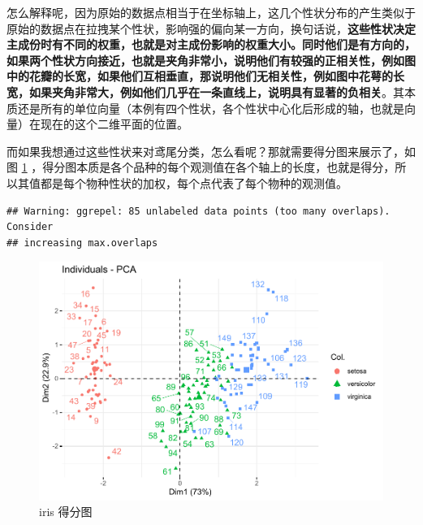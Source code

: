 \documentclass[
]{krantz}
\makeatletter
\newenvironment{Shaded}{\begin{snugshade}}{\end{snugshade}}
\newcommand{\AttributeTok}[1]{\textcolor[rgb]{0.77,0.63,0.00}{#1}}
\newcommand{\ConstantTok}[1]{\textcolor[rgb]{0.00,0.00,0.00}{#1}}
\newcommand{\FunctionTok}[1]{\textcolor[rgb]{0.00,0.00,0.00}{#1}}
\newcommand{\NormalTok}[1]{#1}
\newcommand{\SpecialCharTok}[1]{\textcolor[rgb]{0.00,0.00,0.00}{#1}}
\newenvironment{kframe}{%
\medskip{}
\setlength{\fboxsep}{.8em}
 \def\at@end@of@kframe{}%
 \ifinner\ifhmode%
  \def\at@end@of@kframe{\end{minipage}}%
  \begin{minipage}{\columnwidth}%
 \fi\fi%
 \def\FrameCommand##1{\hskip\@totalleftmargin \hskip-\fboxsep
 \colorbox{shadecolor}{##1}\hskip-\fboxsep
     \hskip-\linewidth \hskip-\@totalleftmargin \hskip\columnwidth}%
 \MakeFramed {\advance\hsize-\width
   \@totalleftmargin\z@ \linewidth\hsize
   \@setminipage}}%
 {\par\unskip\endMakeFramed%
 \at@end@of@kframe}
\renewenvironment{Shaded}{\begin{kframe}}{\end{kframe}}
\makeatother
\begin{document}
怎么解释呢，因为原始的数据点相当于在坐标轴上，这几个性状分布的产生类似于原始的数据点在拉拽某个性状，影响强的偏向某一方向，换句话说，\textbf{这些性状决定主成份时有不同的权重，也就是对主成份影响的权重大小。同时他们是有方向的，如果两个性状方向接近，也就是夹角非常小，说明他们有较强的正相关性，例如图中的花瓣的长宽，如果他们互相垂直，那说明他们无相关性，例如图中花萼的长宽，如果夹角非常大，例如他们几乎在一条直线上，说明具有显著的负相关}。其本质还是所有的单位向量（本例有四个性状，各个性状中心化后形成的轴，也就是向量）在现在的这个二维平面的位置。

而如果我想通过这些性状来对鸢尾分类，怎么看呢？那就需要得分图来展示了，如图 \ref{fig:scorepca} ，得分图本质是各个品种的每个观测值在各个轴上的长度，也就是得分，所以其值都是每个物种性状的加权，每个点代表了每个物种的观测值。

\begin{Shaded}
\end{Shaded}

\begin{verbatim}
## Warning: ggrepel: 85 unlabeled data points (too many overlaps). Consider
## increasing max.overlaps
\end{verbatim}

\begin{figure}
\centering
\includegraphics{bookdown_files/figure-latex/scorepca-1.pdf}
\caption{\label{fig:scorepca}iris 得分图}
\end{figure}
\end{document}
